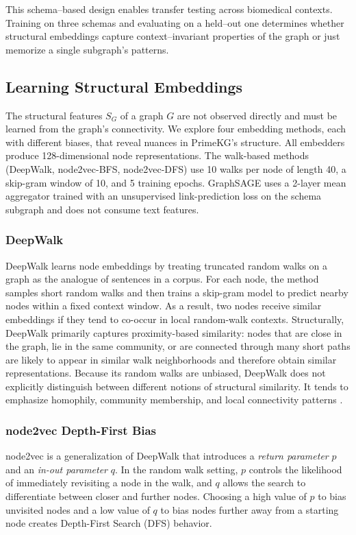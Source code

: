 \documentclass{article}
\theoremstyle{plain}
\theoremstyle{definition}
\theoremstyle{remark}
\begin{document}
This schema--based design enables transfer testing across biomedical contexts. Training on three schemas and evaluating on a held--out one determines whether structural embeddings capture context--invariant properties of the graph or just memorize a single subgraph's patterns.

\subsection{Learning Structural Embeddings}

The structural features $S_G$ of a graph $G$ are not observed directly and must be learned from the graph's connectivity. We explore four embedding methods, each with different biases, that reveal nuances in PrimeKG's structure. All embedders produce 128-dimensional node representations. The walk-based methods (DeepWalk, node2vec-BFS, node2vec-DFS) use 10 walks per node of length 40, a skip-gram window of 10, and 5 training epochs. GraphSAGE uses a 2-layer mean aggregator trained with an unsupervised link-prediction loss on the schema subgraph and does not consume text features.

\subsubsection{DeepWalk}

DeepWalk learns node embeddings by treating truncated random walks on a graph as the analogue of sentences in a corpus. For each node, the method samples short random walks and then trains a skip-gram model to predict nearby nodes within a fixed context window. As a result, two nodes receive similar embeddings if they tend to co-occur in local random-walk contexts. Structurally, DeepWalk primarily captures proximity-based similarity: nodes that are close in the graph, lie in the same community, or are connected through many short paths are likely to appear in similar walk neighborhoods and therefore obtain similar representations. Because its random walks are unbiased, DeepWalk does not explicitly distinguish between different notions of structural similarity. It tends to emphasize homophily, community membership, and local connectivity patterns \citep{deepwalk}.

\subsubsection{node2vec Depth-First Bias}

node2vec \citep{node2vec} is a generalization of DeepWalk that introduces a \textit{return parameter} $p$ and an \textit{in-out parameter} $q$. In the random walk setting, $p$ controls the likelihood of immediately revisiting a node in the walk, and $q$ allows the search to differentiate between closer and further nodes. Choosing a high value of $p$ to bias unvisited nodes and a low value of $q$ to bias nodes further away from a starting node creates Depth-First Search (DFS) behavior.
\end{document}

